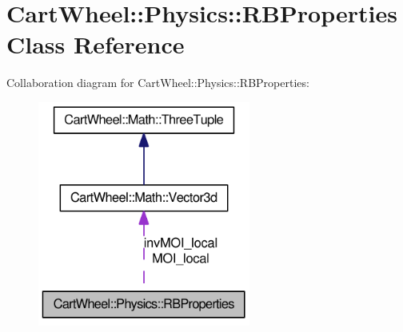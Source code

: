 \hypertarget{classCartWheel_1_1Physics_1_1RBProperties}{
\section{CartWheel::Physics::RBProperties Class Reference}
\label{classCartWheel_1_1Physics_1_1RBProperties}
}


Collaboration diagram for CartWheel::Physics::RBProperties:\nopagebreak
\begin{figure}[H]
\begin{center}
\leavevmode
\includegraphics[width=198pt]{classCartWheel_1_1Physics_1_1RBProperties__coll__graph}
\end{center}
\end{figure}
